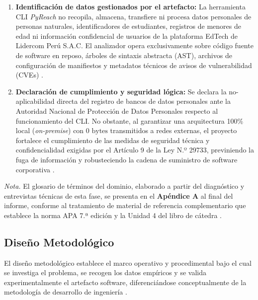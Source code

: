 \begin{enumerate}[leftmargin=1.27cm, label=\alph*)]
    \item \textbf{Identificación de datos gestionados por el artefacto:} La herramienta CLI \textit{PyReach} no recopila, almacena, transfiere ni procesa datos personales de personas naturales, identificadores de estudiantes, registros de menores de edad ni información confidencial de usuarios de la plataforma EdTech de Lidercom Perú S.A.C. El analizador opera exclusivamente sobre código fuente de software en reposo, árboles de sintaxis abstracta (AST), archivos de configuración de manifiestos y metadatos técnicos de avisos de vulnerabilidad (CVEs) \parencite{openssf2023osv}. %
    \item \textbf{Declaración de cumplimiento y seguridad lógica:} Se declara la no-aplicabilidad directa del registro de bancos de datos personales ante la Autoridad Nacional de Protección de Datos Personales respecto al funcionamiento del CLI. No obstante, al garantizar una arquitectura 100\% local (\textit{on-premise}) con $0\text{ bytes}$ transmitidos a redes externas, el proyecto fortalece el cumplimiento de las medidas de seguridad técnica y confidencialidad exigidas por el Artículo 9 de la Ley N.º 29733, previniendo la fuga de información y robusteciendo la cadena de suministro de software corporativa \parencite{ladisa2023sok, gutierrez2024auditoria}. %
\end{enumerate}

\vspace{0.3cm}
\noindent
\textit{Nota.} El glosario de términos del dominio, elaborado a partir del diagnóstico y entrevistas técnicas de esta fase, se presenta en el \textbf{Apéndice A} al final del informe, conforme al tratamiento de material de referencia complementario que establece la norma APA 7.ª edición y la Unidad 4 del libro de cátedra \parencite{apa2020publication, torres2026proyecto}.

\subsection{Diseño Metodológico}
El diseño metodológico establece el marco operativo y procedimental bajo el cual se investiga el problema, se recogen los datos empíricos y se valida experimentalmente el artefacto software, diferenciándose conceptualmente de la metodología de desarrollo de ingeniería \parencite{hernandez2014metodologia, torres2026proyecto}. %

